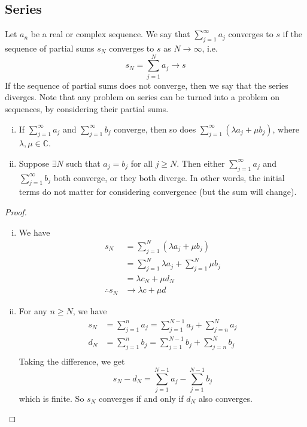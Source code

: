 \subsection{Series}
Let \(a_n\) be a real or complex sequence.
We say that \(\sum_{j=1}^\infty a_j\) converges to \(s\) if the sequence of partial sums \(s_N\) converges to \(s\) as \(N \to \infty\), i.e.
\[
	s_N = \sum_{j=1}^N a_j \to s
\]
If the sequence of partial sums does not converge, then we say that the series diverges.
Note that any problem on series can be turned into a problem on sequences, by considering their partial sums.
\begin{lemma}
	\begin{enumerate}[(i)]
		\item If \(\sum_{j=1}^\infty a_j\) and \(\sum_{j=1}^\infty b_j\) converge, then so does \(\sum_{j=1}^\infty (\lambda a_j + \mu b_j)\), where \(\lambda, \mu \in \mathbb C\).
		\item Suppose \(\exists N\) such that \(a_j = b_j\) for all \(j \geq N\).
		      Then either \(\sum_{j=1}^\infty a_j\) and \(\sum_{j=1}^\infty b_j\) both converge, or they both diverge.
		      In other words, the initial terms do not matter for considering convergence (but the sum will change).
	\end{enumerate}
\end{lemma}
\begin{proof}
	\begin{enumerate}[(i)]
		\item We have
		      \begin{align*}
			      s_N            & = \sum_{j=1}^N (\lambda a_j + \mu b_j)            \\
			                     & = \sum_{j=1}^N \lambda a_j + \sum_{j=1}^N \mu b_j \\
			                     & = \lambda c_N + \mu d_N                           \\
			      \therefore s_N & \to \lambda c + \mu d
		      \end{align*}
		\item For any \(n \geq N\), we have
		      \begin{align*}
			      s_N & = \sum_{j=1}^n a_j = \sum_{j=1}^{N-1} a_j + \sum_{j=n}^N a_j \\
			      d_N & = \sum_{j=1}^n b_j = \sum_{j=1}^{N-1} b_j + \sum_{j=n}^N b_j \\
		      \end{align*}
		      Taking the difference, we get
		      \[
			      s_N - d_N = \sum_{j=1}^{N-1} a_j - \sum_{j=1}^{N-1} b_j
		      \]
		      which is finite.
		      So \(s_N\) converges if and only if \(d_N\) also converges.
	\end{enumerate}
\end{proof}
